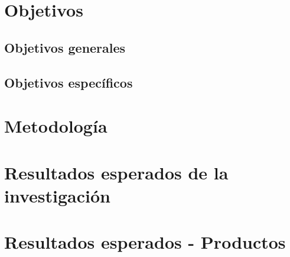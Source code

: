 \documentclass{article}
\begin{document}
\section{Objetivos}

\subsection{Objetivos generales} 

\subsection{Objetivos específicos}

\section{Metodolog\'ia}

\section{Resultados esperados de la investigaci\'on}

\section{Resultados esperados - Productos}

\end{document}
